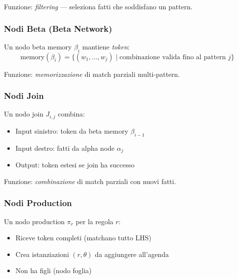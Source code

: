 Funzione: \textit{filtering} --- seleziona fatti che soddisfano un pattern.

\subsubsection{Nodi Beta (Beta Network)}

\begin{definizione}
Un nodo beta memory $\beta_i$ mantiene \textit{token}:
\begin{equation}
\text{memory}(\beta_i) = \{(w_1, \ldots, w_j) \mid \text{combinazione valida fino al pattern } j\}
\end{equation}
\end{definizione}

Funzione: \textit{memorizzazione} di match parziali multi-pattern.

\subsubsection{Nodi Join}

\begin{definizione}
Un nodo join $J_{i,j}$ combina:
\begin{itemize}
\item Input sinistro: token da beta memory $\beta_{i-1}$
\item Input destro: fatti da alpha node $\alpha_j$
\item Output: token estesi se join ha successo
\end{itemize}
\end{definizione}

Funzione: \textit{combinazione} di match parziali con nuovi fatti.

\subsubsection{Nodi Production}

\begin{definizione}
Un nodo production $\pi_r$ per la regola $r$:
\begin{itemize}
\item Riceve token completi (matchano tutto LHS)
\item Crea istanziazioni $(r, \theta)$ da aggiungere all'agenda
\item Non ha figli (nodo foglia)
\end{itemize}
\end{definizione}

